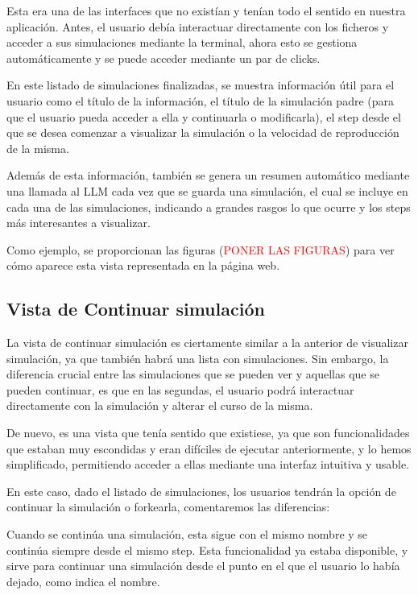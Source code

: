 Esta era una de las interfaces que no existían y tenían todo el sentido en nuestra aplicación. Antes, el usuario debía interactuar directamente con los ficheros y acceder a sus simulaciones mediante la terminal, ahora esto se gestiona automáticamente y se puede acceder mediante un par de clicks.

En este listado de simulaciones finalizadas, se muestra información útil para el usuario como el título de la información, el título de la simulación padre (para que el usuario pueda acceder a ella y continuarla o modificarla), el step desde el que se desea comenzar a visualizar la simulación o la velocidad de reproducción de la misma.

Además de esta información, también se genera un resumen automático mediante una llamada al LLM cada vez que se guarda una simulación, el cual se incluye en cada una de las simulaciones, indicando a grandes rasgos lo que ocurre y los steps más interesantes a visualizar.

Como ejemplo, se proporcionan las figuras (\textcolor{red}{PONER LAS FIGURAS}) para ver cómo aparece esta vista representada en la página web.


\subsection{Vista de Continuar simulación}

La vista de continuar simulación es ciertamente similar a la anterior de visualizar simulación, ya que también habrá una lista con simulaciones. Sin embargo, la diferencia crucial entre las simulaciones que se pueden ver y aquellas que se pueden continuar, es que en las segundas, el usuario podrá interactuar directamente con la simulación y alterar el curso de la misma.

De nuevo, es una vista que tenía sentido que existiese, ya que son funcionalidades que estaban muy escondidas y eran difíciles de ejecutar anteriormente, y lo hemos simplificado, permitiendo acceder a ellas mediante una interfaz intuitiva y usable.

En este caso, dado el listado de simulaciones, los usuarios tendrán la opción de continuar la simulación o forkearla, comentaremos las diferencias:

Cuando se continúa una simulación, esta sigue con el mismo nombre y se continúa siempre desde el mismo step. Esta funcionalidad ya estaba disponible, y sirve para continuar una simulación desde el punto en el que el usuario lo había dejado, como indica el nombre.

